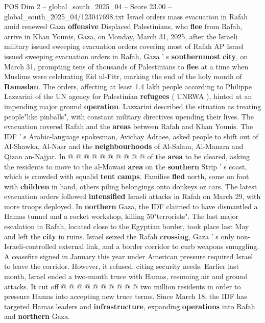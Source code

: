 \begin{textsample}{POS Dim 2 – global\_south\_2025\_04 – Score 23.00 – global\_south\_2025\_04/123047698.txt}  \label{ex:f2_pos_278}
Israel orders mass evacuation in Rafah amid renewed Gaza \textbf{offensive} Displaced Palestinians, who \textbf{flee} from Rafah, arrive in Khan Younis, Gaza, on Monday, March 31, 2025, after the Israeli military issued sweeping evacuation orders covering most of Rafah AP Israel issued sweeping evacuation orders in Rafah, Gaza ' s \textbf{southernmost} \textbf{city}, on March 31, prompting tens of thousands of Palestinians to \textbf{flee} at a time when Muslims were celebrating Eid ul-Fitr, marking the end of the holy month of \textbf{Ramadan}.
The orders, affecting at least 1.4 lakh people according to Philippe Lazzarini of the UN agency for Palestinian \textbf{refugees} ( UNRWA ), hinted at an impending major ground \textbf{operation}.
Lazzarini described the situation as treating people"like pinballs", with constant military directives upending their lives.
The evacuation covered Rafah and the \textbf{areas} between Rafah and Khan Younis.
The IDF ' s Arabic-language spokesman, Avichay Adraee, asked people to shift out of Al-Shawka, Al-Nasr and the \textbf{neighbourhoods} of Al-Salam, Al-Manara and Qizan an-Najjar.
In @ @ @ @ @ @ @ @ @ @ of the \textbf{area} to be cleared, asking the residents to move to the al-Mawasi \textbf{area} on the \textbf{southern} Strip ' s coast, which is crowded with squalid \textbf{tent} \textbf{camps}.
Families \textbf{fled} north, some on foot with \textbf{children} in hand, others piling belongings onto donkeys or cars.
The latest evacuation orders followed \textbf{intensified} Israeli attacks in Rafah on March 29, with more troops deployed.
In \textbf{northern} Gaza, the IDF claimed to have dismantled a Hamas tunnel and a rocket workshop, killing 50"terrorists".
The last major escalation in Rafah, located close to the Egyptian border, took place last May and left the \textbf{city} in ruins.
Israel seized the Rafah \textbf{crossing}, Gaza ' s only non-Israeli-controlled external link, and a border corridor to curb weapons smuggling.
A ceasefire signed in January this year under American pressure required Israel to leave the corridor.
However, it refused, citing security needs.
Earlier last month, Israel ended a two-month truce with Hamas, resuming air and ground attacks.
It cut off @ @ @ @ @ @ @ @ @ @ two million residents in order to pressure Hamas into accepting new truce terms.
Since March 18, the IDF has targeted Hamas leaders and \textbf{infrastructure}, expanding \textbf{operations} into Rafah and \textbf{northern} Gaza.

\end{textsample}
